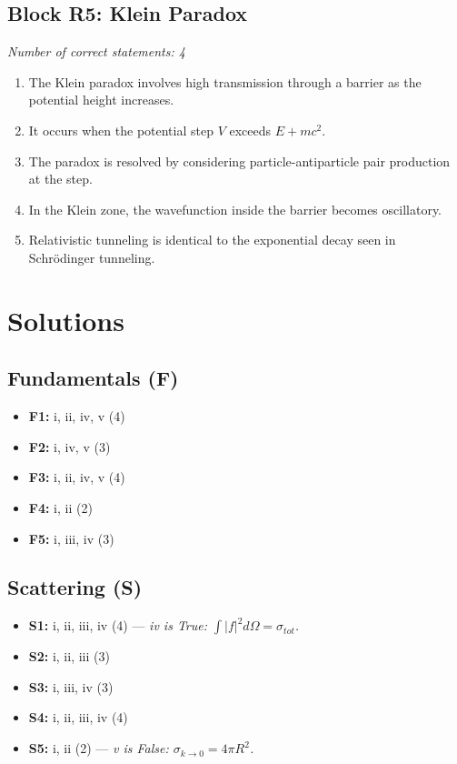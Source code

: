\documentclass[a4paper,12pt]{article}
\begin{document}
\subsection*{Block R5: Klein Paradox}
\textit{Number of correct statements: 4}
\begin{enumerate}[label=\roman*.]
    \item The Klein paradox involves high transmission through a barrier as the potential height increases.
    \item It occurs when the potential step $V$ exceeds $E + mc^2$.
    \item The paradox is resolved by considering particle-antiparticle pair production at the step.
    \item In the Klein zone, the wavefunction inside the barrier becomes oscillatory.
    \item Relativistic tunneling is identical to the exponential decay seen in Schrödinger tunneling.
\end{enumerate}

\newpage

\section*{Solutions}

\subsection*{Fundamentals (F)}
\begin{itemize}
    \item \textbf{F1:} i, ii, iv, v (4)
    \item \textbf{F2:} i, iv, v (3)
    \item \textbf{F3:} i, ii, iv, v (4)
    \item \textbf{F4:} i, ii (2)
    \item \textbf{F5:} i, iii, iv (3)
\end{itemize}

\subsection*{Scattering (S)}
\begin{itemize}
    \item \textbf{S1:} i, ii, iii, iv (4) --- \textit{iv is True: $\int |f|^2 d\Omega = \sigma_{tot}$.}
    \item \textbf{S2:} i, ii, iii (3)
    \item \textbf{S3:} i, iii, iv (3)
    \item \textbf{S4:} i, ii, iii, iv (4)
    \item \textbf{S5:} i, ii (2) --- \textit{v is False: $\sigma_{k \to 0} = 4\pi R^2$.}
\end{itemize}
\end{document}
